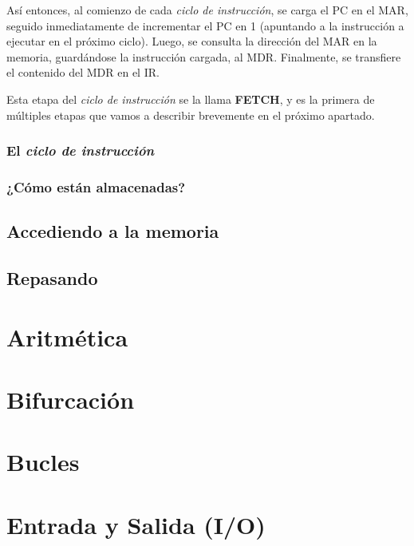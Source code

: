 \documentclass[a4paper, titlepage]{report}
\begin{document}
	Así entonces, al comienzo de cada \textit{ciclo de instrucción}, se carga el PC en el MAR, seguido inmediatamente de incrementar el PC en 1 (apuntando a la instrucción a ejecutar en el próximo ciclo). Luego, se consulta la dirección del MAR en la memoria, guardándose la instrucción cargada, al MDR. Finalmente, se transfiere el contenido del MDR en el IR.
	
	Esta etapa del \textit{ciclo de instrucción} se la llama \textbf{FETCH}, y es la primera de múltiples etapas que vamos a describir brevemente en el próximo apartado.
	
	\subsubsection{El \textit{ciclo de instrucción}}
	
	
	\subsubsection{¿Cómo están almacenadas?} %
	
	\subsection{Accediendo a la memoria} %
	
	\subsection{Repasando}
	
	\section{Aritmética}
	\label{sec:arithmetic}
	
	\section{Bifurcación} %
	\label{sec:branching}
	
	\section{Bucles} %
	
	\section{Entrada y Salida (I/O)}
	\label{sec:io}
	
\end{document}
